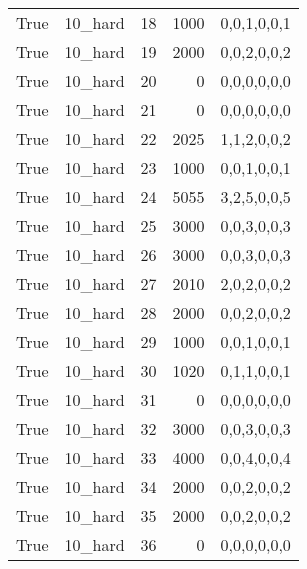 \begin{tabular}{llrrl}
 True            & 10\_hard             &            18 &                  1000 & 0,0,1,0,0,1   \\
 True            & 10\_hard             &            19 &                  2000 & 0,0,2,0,0,2   \\
 True            & 10\_hard             &            20 &                     0 & 0,0,0,0,0,0   \\
 True            & 10\_hard             &            21 &                     0 & 0,0,0,0,0,0   \\
 True            & 10\_hard             &            22 &                  2025 & 1,1,2,0,0,2   \\
 True            & 10\_hard             &            23 &                  1000 & 0,0,1,0,0,1   \\
 True            & 10\_hard             &            24 &                  5055 & 3,2,5,0,0,5   \\
 True            & 10\_hard             &            25 &                  3000 & 0,0,3,0,0,3   \\
 True            & 10\_hard             &            26 &                  3000 & 0,0,3,0,0,3   \\
 True            & 10\_hard             &            27 &                  2010 & 2,0,2,0,0,2   \\
 True            & 10\_hard             &            28 &                  2000 & 0,0,2,0,0,2   \\
 True            & 10\_hard             &            29 &                  1000 & 0,0,1,0,0,1   \\
 True            & 10\_hard             &            30 &                  1020 & 0,1,1,0,0,1   \\
 True            & 10\_hard             &            31 &                     0 & 0,0,0,0,0,0   \\
 True            & 10\_hard             &            32 &                  3000 & 0,0,3,0,0,3   \\
 True            & 10\_hard             &            33 &                  4000 & 0,0,4,0,0,4   \\
 True            & 10\_hard             &            34 &                  2000 & 0,0,2,0,0,2   \\
 True            & 10\_hard             &            35 &                  2000 & 0,0,2,0,0,2   \\
 True            & 10\_hard             &            36 &                     0 & 0,0,0,0,0,0   \\

\end{tabular}
